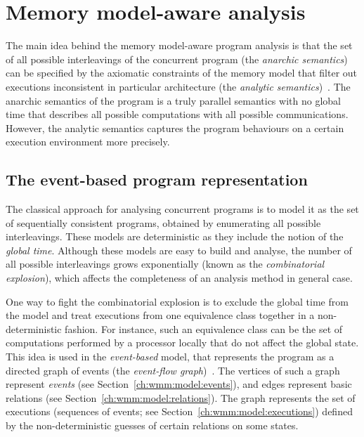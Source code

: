 \chapter{Memory model-aware analysis}
\label{ch:wmm}

The main idea behind the memory model-aware program analysis is that the set of all possible interleavings of the concurrent program (the \textit{anarchic semantics}) can be specified by the axiomatic constraints of the memory model that filter out executions inconsistent in particular architecture (the \textit{analytic semantics})~\cite{alglave2016syntax}.
The anarchic semantics of the program is a truly parallel semantics with no global time that describes all possible computations with all possible communications.
However, the analytic semantics captures the program behaviours on a certain execution environment more precisely.


\section{The event-based program representation}
\label{ch:wmm:event}

The classical approach for analysing concurrent programs is to model it as the set of sequentially consistent programs, obtained by enumerating all possible interleavings.
These models are deterministic as they include the notion of the \textit{global time}. %
Although these models are easy to build and analyse, the number of all possible interleavings grows exponentially (known as the \textit{combinatorial explosion}), which affects the completeness of an analysis method in general case.

One way to fight the combinatorial explosion is to exclude the global time from the model and treat executions from one equivalence class together in a non-deterministic fashion.
For instance, such an equivalence class can be the set of computations performed by a processor locally that do not affect the global state.
This idea is used in the \textit{event-based} model, that represents the program as a directed graph of events (the \textit{event-flow graph})~\cite{alglave2010shared}.
The vertices of such a graph represent \textit{events} (see Section~\ref{ch:wmm:model:events}), and edges represent basic relations (see Section~\ref{ch:wmm:model:relations}).
The graph represents the set of executions (sequences of events; see Section~\ref{ch:wmm:model:executions}) defined by the non-deterministic guesses of certain relations on some states.

